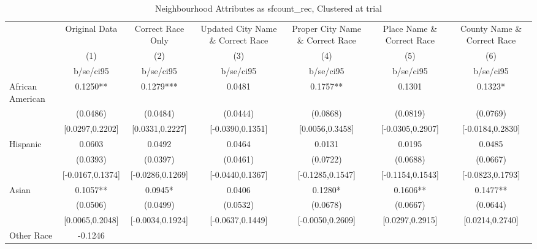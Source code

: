 \documentclass{article}
\begin{document}
\begin{table}[htbp]\centering
\def\sym#1{\ifmmode^{#1}\else\(^{#1}\)\fi}
\caption{Neighbourhood Attributes as sfcount\_rec, Clustered at trial}
\begin{tabular}{l*{6}{c}}
\toprule
                    &\multicolumn{1}{c}{Original Data}&\multicolumn{1}{c}{Correct Race Only}&\multicolumn{1}{c}{Updated City Name \& Correct Race}&\multicolumn{1}{c}{Proper City Name \& Correct Race}&\multicolumn{1}{c}{Place Name \& Correct Race}&\multicolumn{1}{c}{County Name \& Correct Race}\\\cmidrule(lr){2-2}\cmidrule(lr){3-3}\cmidrule(lr){4-4}\cmidrule(lr){5-5}\cmidrule(lr){6-6}\cmidrule(lr){7-7}
                    &\multicolumn{1}{c}{(1)}   &\multicolumn{1}{c}{(2)}   &\multicolumn{1}{c}{(3)}   &\multicolumn{1}{c}{(4)}   &\multicolumn{1}{c}{(5)}   &\multicolumn{1}{c}{(6)}   \\
                    &   b/se/ci95   &   b/se/ci95   &   b/se/ci95   &   b/se/ci95   &   b/se/ci95   &   b/se/ci95   \\
\midrule
African American    &      0.1250** &      0.1279***&      0.0481   &      0.1757** &      0.1301   &      0.1323*  \\
                    &    (0.0486)   &    (0.0484)   &    (0.0444)   &    (0.0868)   &    (0.0819)   &    (0.0769)   \\
                    &[0.0297,0.2202]   &[0.0331,0.2227]   &[-0.0390,0.1351]   &[0.0056,0.3458]   &[-0.0305,0.2907]   &[-0.0184,0.2830]   \\
Hispanic            &      0.0603   &      0.0492   &      0.0464   &      0.0131   &      0.0195   &      0.0485   \\
                    &    (0.0393)   &    (0.0397)   &    (0.0461)   &    (0.0722)   &    (0.0688)   &    (0.0667)   \\
                    &[-0.0167,0.1374]   &[-0.0286,0.1269]   &[-0.0440,0.1367]   &[-0.1285,0.1547]   &[-0.1154,0.1543]   &[-0.0823,0.1793]   \\
Asian               &      0.1057** &      0.0945*  &      0.0406   &      0.1280*  &      0.1606** &      0.1477** \\
                    &    (0.0506)   &    (0.0499)   &    (0.0532)   &    (0.0678)   &    (0.0667)   &    (0.0644)   \\
                    &[0.0065,0.2048]   &[-0.0034,0.1924]   &[-0.0637,0.1449]   &[-0.0050,0.2609]   &[0.0297,0.2915]   &[0.0214,0.2740]   \\
Other Race          &     -0.1246   &               &               &               &               &               \\

\end{tabular}
\end{table}
\end{document}
